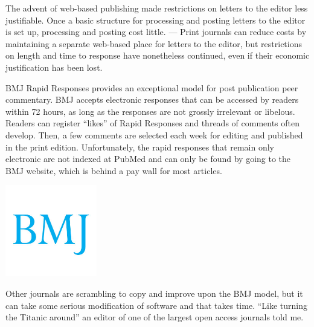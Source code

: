 \documentclass[11pt,twoside,a4paper]{article}
\begin{document}
The advent of web-based publishing made restrictions on letters to the editor less justifiable. Once a basic structure for processing and posting letters to the editor is set up, processing and posting cost little. --- Print journals can reduce costs by maintaining a separate web-based place for letters to the editor, but restrictions on length and time to response have nonetheless continued, even if their economic justification has been lost. ~\\

\begin{minipage}[h]{14.75cm}
	BMJ Rapid Responses provides an exceptional model for post publication peer commentary. BMJ accepts electronic responses that can be accessed by readers within 72 hours, as long as the responses are not grossly irrelevant or libelous. Readers can register ``likes'' of Rapid Responses and threads of comments often develop. Then, a few comments are selected each week for editing and published in the print edition. Unfortunately, the rapid responses that remain only electronic are not indexed at PubMed and can only be found by going to the BMJ website, which is behind a pay wall for most articles. ~\\
\end{minipage} \hfill \begin{minipage}[h]{4.25cm}
	\includegraphics[width=4.00cm]{img/bmj-logo-og.jpg}
\end{minipage}

Other journals are scrambling to copy and improve upon the BMJ model, but it can take some serious modification of software and that takes time. ``Like turning the Titanic around'' an editor of one of the largest open access journals told me. ~\\
\end{document}
